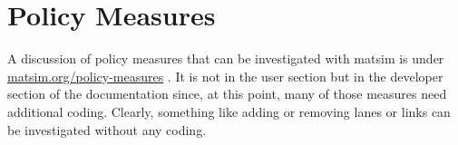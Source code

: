 \chapter{Policy Measures}

A discussion of policy measures that can be investigated with matsim is under \href{http://matsim.org/policy-measures}{matsim.org/policy-measures}  . It is not in the user section but in the developer section of  the documentation since, at this point, many of those measures need  additional coding. Clearly, something like adding or removing lanes or  links can be investigated without any coding.


